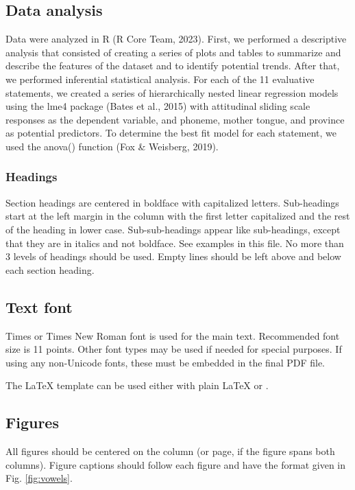 \documentclass[
  a4paper,
  11pt,
  twocolumn]{article}
\begin{document}
\subsection{Data analysis}

Data were analyzed in R (R Core Team, 2023). First, we performed a
descriptive analysis that consisted of creating a series of plots and
tables to summarize and describe the features of the dataset and to
identify potential trends. After that, we performed inferential
statistical analysis. For each of the 11 evaluative statements, we
created a series of hierarchically nested linear regression models using
the lme4 package (Bates et al., 2015) with attitudinal sliding scale
responses as the dependent variable, and phoneme, mother tongue, and
province as potential predictors. To determine the best fit model for
each statement, we used the anova() function (Fox \& Weisberg, 2019).

\subsubsection{Headings}

Section headings are centered in boldface with capitalized letters.
Sub-headings start at the left margin in the column with the first
letter capitalized and the rest of the heading in lower case.
Sub-sub-headings appear like sub-headings, except that they are in
italics and not boldface. See examples in this file. No more than 3
levels of headings should be used. Empty lines should be left above and
below each section heading.

\subsection{Text font}

Times or Times New Roman font is used for the main text. Recommended
font size is 11 points. Other font types may be used if needed for
special purposes. If using any non-Unicode fonts, these must be embedded
in the final PDF file.

The \LaTeX{} template can be used either with plain \LaTeX{} or
\XeLaTeX.

\subsection{Figures}

All figures should be centered on the column (or page, if the figure
spans both columns). Figure captions should follow each figure and have
the format given in Fig. \ref{fig:vowels}.
\end{document}
